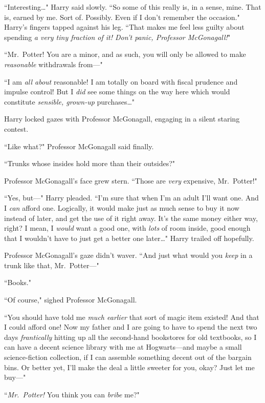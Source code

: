``Interesting{\ldots}" Harry said slowly. ``So some of this really is, in a sense, mine. That is, earned by me. Sort of. Possibly. Even if I don't remember the occasion." Harry's fingers tapped against his leg. ``That makes me feel less guilty about spending \emph{a very tiny fraction of it! Don't panic, Professor McGonagall!}"

``Mr.~Potter! You are a minor, and as such, you will only be allowed to make \emph{reasonable} withdrawals from---"

``I am \emph{all about} reasonable! I am totally on board with fiscal prudence and impulse control! But I \emph{did} see some things on the way here which would constitute \emph{sensible, grown-up} purchases{\ldots}"

Harry locked gazes with Professor McGonagall, engaging in a silent staring contest.

``Like what?" Professor McGonagall said finally.

``Trunks whose insides hold more than their outsides?"

Professor McGonagall's face grew stern. ``Those are \emph{very} expensive, Mr.~Potter!"

``Yes, but---" Harry pleaded. ``I'm sure that when I'm an adult I'll want one. And I \emph{can} afford one. Logically, it would make just as much sense to buy it now instead of later, and get the use of it right away. It's the same money either way, right? I mean, I \emph{would} want a good one, with \emph{lots} of room inside, good enough that I wouldn't have to just get a better one later{\ldots}" Harry trailed off hopefully.

Professor McGonagall's gaze didn't waver. ``And just what would you \emph{keep} in a trunk like that, Mr.~Potter---"

``Books."

``Of course," sighed Professor McGonagall.

``You should have told me \emph{much earlier} that sort of magic item existed! And that I could afford one! Now my father and I are going to have to spend the next two days \emph{frantically} hitting up all the second-hand bookstores for old textbooks, so I can have a decent science library with me at Hogwarts---and maybe a small science-fiction collection, if I can assemble something decent out of the bargain bins. Or better yet, I'll make the deal a little sweeter for you, okay? Just let me buy---"

``\emph{Mr.~Potter!} You think you can \emph{bribe} me?"

